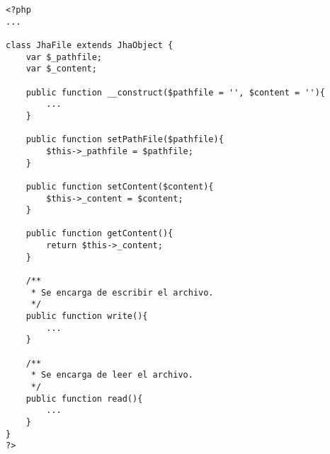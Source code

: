 \begin{lstlisting}[label=jha_file,caption=JhaFile.]
<?php
...

class JhaFile extends JhaObject {
	var $_pathfile;
	var $_content;
	
	public function __construct($pathfile = '', $content = ''){
		...
	}
	
	public function setPathFile($pathfile){
		$this->_pathfile = $pathfile;
	}
	
	public function setContent($content){
		$this->_content = $content;
	}
	
	public function getContent(){
		return $this->_content;
	}
	
	/**
	 * Se encarga de escribir el archivo.
	 */
	public function write(){
		...
	}
	
	/**
	 * Se encarga de leer el archivo.
	 */
	public function read(){
		...
	}
}
?>
\end{lstlisting}
